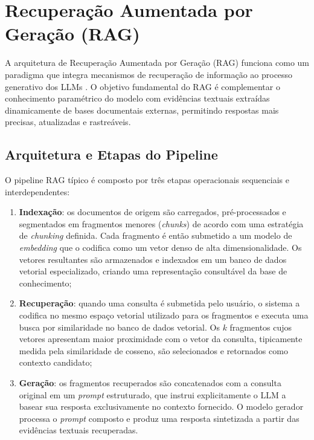 \documentclass[
	12pt,				%
	openright,			%
	oneside,			%
	a4paper,			%
	tccpreliminar,		%
	]{ABNT-DC-UEL}
\begin{document}
\section{Recuperação Aumentada por Geração (RAG)}
\label{sec:rag}

A arquitetura de Recuperação Aumentada por Geração (RAG) funciona como um paradigma que integra mecanismos de recuperação de informação ao processo generativo dos LLMs \cite{lewis2020rag}. O objetivo fundamental do RAG é complementar o conhecimento paramétrico do modelo com evidências textuais extraídas dinamicamente de bases documentais externas, permitindo respostas mais precisas, atualizadas e rastreáveis.

\subsection{Arquitetura e Etapas do Pipeline}

O pipeline RAG típico é composto por três etapas operacionais sequenciais e interdependentes:

\begin{enumerate}
    \item \textbf{Indexação}: os documentos de origem são carregados, pré-processados e segmentados em fragmentos menores (\textit{chunks}) de acordo com uma estratégia de \textit{chunking} definida. Cada fragmento é então submetido a um modelo de \textit{embedding} que o codifica como um vetor denso de alta dimensionalidade. Os vetores resultantes são armazenados e indexados em um banco de dados vetorial especializado, criando uma representação consultável da base de conhecimento;
    
    \item \textbf{Recuperação}: quando uma consulta é submetida pelo usuário, o sistema a codifica no mesmo espaço vetorial utilizado para os fragmentos e executa uma busca por similaridade no banco de dados vetorial. Os $k$ fragmentos cujos vetores apresentam maior proximidade com o vetor da consulta, tipicamente medida pela similaridade de cosseno, são selecionados e retornados como contexto candidato;
    
    \item \textbf{Geração}: os fragmentos recuperados são concatenados com a consulta original em um \textit{prompt} estruturado, que instrui explicitamente o LLM a basear sua resposta exclusivamente no contexto fornecido. O modelo gerador processa o \textit{prompt} composto e produz uma resposta sintetizada a partir das evidências textuais recuperadas.
\end{enumerate}
\end{document}
